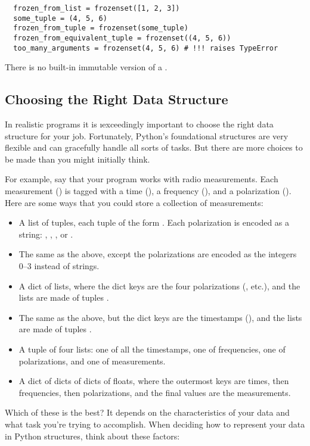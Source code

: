 \documentclass[letterpaper, 12pt, titlepage, twoside]{article}
\begin{document}
\begin{lstlisting}
  frozen_from_list = frozenset([1, 2, 3])
  some_tuple = (4, 5, 6)
  frozen_from_tuple = frozenset(some_tuple)
  frozen_from_equivalent_tuple = frozenset((4, 5, 6))
  too_many_arguments = frozenset(4, 5, 6) # !!! raises TypeError
\end{lstlisting}

There is no built-in immutable version of a .

\subsection*{Choosing the Right Data Structure}

In realistic programs it is \i{exceedingly} important to choose the right data
structure for your job. Fortunately, Python's foundational structures are very
flexible and can gracefully handle all sorts of tasks. But there are more
choices to be made than you might initially think.

For example, say that your program works with radio measurements. Each
measurement () is tagged with a time (), a frequency (), and a
polarization (). Here are some ways that you could store a collection of
measurements:

\begin{itemize}
\item A list of tuples, each tuple of the form . Each
  polarization is encoded as a string: , , , or
  .
\item The same as the above, except the polarizations are encoded as the
  integers 0--3 instead of strings.
\item A dict of lists, where the dict keys are the four polarizations
  (, etc.), and the lists are made of tuples .
\item The same as the above, but the dict keys are the timestamps
  (), and the lists are made of tuples .
\item A tuple of four lists: one of all the timestamps, one of frequencies,
  one of polarizations, and one of measurements.
\item A dict of dicts of dicts of floats, where the outermost keys are times,
  then frequencies, then polarizations, and the final values are the
  measurements.
\end{itemize}

Which of these is the best? It depends on the characteristics of your data and
what task you're trying to accomplish. When deciding how to represent your data in
Python structures, think about these factors:
\end{document}
